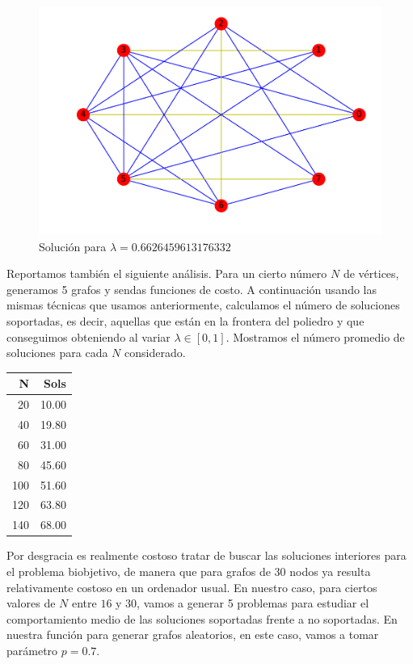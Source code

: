 \documentclass[twoside,a4paper,openright,12pt,tikz]{book}
\begin{document}
\begin{figure}[h!]
\centering
\includegraphics[scale=0.5]{opt4}
\caption{Solución para $\lambda=0.6626459613176332$}
\end{figure}
\newpage
Reportamos también el siguiente análisis. Para un cierto número $N$ de vértices, generamos 5 grafos y sendas funciones de costo. A continuación usando las mismas técnicas que usamos anteriormente, calculamos el número de soluciones soportadas, es decir, aquellas que están en la frontera del poliedro y que conseguimos obteniendo al variar $\lambda \in [0,1]$. Mostramos el número promedio de soluciones para cada $N$ considerado.
\begin{table}[ht]
\centering
\begin{tabular}{rr}
  \hline
  N & Sols \\ 
  \hline
20 & 10.00 \\ 
40 & 19.80 \\ 
60 & 31.00 \\ 
80 & 45.60 \\ 
100 & 51.60 \\ 
120 & 63.80 \\ 
140 & 68.00 \\ 
   \hline
\end{tabular}
\end{table}

Por desgracia es realmente costoso tratar de buscar las soluciones interiores para el problema biobjetivo, de manera que para grafos de 30 nodos ya resulta relativamente costoso en un ordenador usual. En nuestro caso, para ciertos valores de $N$ entre $16$ y $30$, vamos a generar 5 problemas para estudiar el comportamiento medio de las soluciones soportadas frente a no soportadas. En nuestra función para generar grafos aleatorios, en este caso, vamos a tomar parámetro $p=0.7$. 
\end{document}
